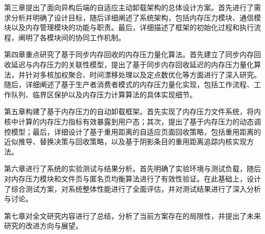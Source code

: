 第三章提出了面向异构后端的自适应主动卸载架构的总体设计方案。首先进行了需求分析并明确了设计目标，随后详细阐述了系统架构，包括内存压力模块、通信模块以及内存管理模块的功能与职责。最后，详细描述了框架的初始化过程和执行流程，阐明了各模块间的协同工作机制。

第四章重点研究了基于同步内存回收的内存压力量化算法。首先建立了同步内存回收延迟与内存压力的关联性模型，提出了基于同步内存回收延迟的内存压力量化算法，并针对多核加权聚合、时间漂移处理以及定点数优化等方面进行了深入研究。随后，详细阐述了基于生产者消费者模式的内存压力量化实现，包括工作流程、工作队列、临界区保护以及内存压力计算算法的具体实现细节。

第五章构建了基于内存压力的自动卸载框架。首先实现了内存压力文件系统，将内核中计算的内存压力指标有效暴露到用户态；其次，提出了基于内存压力的动态调控模型；最后，详细设计了基于重用距离的自适应页面回收策略，包括重用距离的近似推导、替换决策与回收策略，以及基于阴影条目的重用距离追踪内核实现方法。

第六章进行了系统的实验测试与结果分析。首先明确了实验环境与测试负载，随后对内存压力模块和文件页与匿名页均衡算法进行了有效性验证。在此基础上，设计了综合测试方案，对系统整体性能进行了全面评估，并对测试结果进行了深入分析与讨论。

第七章对全文研究内容进行了总结，分析了当前方案存在的局限性，并提出了未来研究的改进方向与展望。



